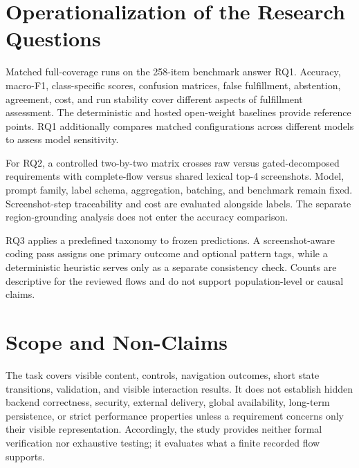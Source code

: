 \section{Operationalization of the Research Questions}\label{operationalization-of-the-research-questions}

Matched full-coverage runs on the 258-item benchmark answer RQ1. Accuracy,
macro-F1, class-specific scores, confusion matrices, false fulfillment,
abstention, agreement, cost, and run stability cover different aspects of
fulfillment assessment. The deterministic and hosted open-weight baselines
provide reference points. RQ1 additionally compares matched configurations
across different models to assess model sensitivity.

For RQ2, a controlled two-by-two matrix crosses raw versus gated-decomposed
requirements with complete-flow versus shared lexical top-4 screenshots. Model, prompt
family, label schema, aggregation, batching, and benchmark remain fixed.
Screenshot-step traceability and cost are evaluated alongside labels. The
separate region-grounding analysis does not enter the accuracy comparison.

RQ3 applies a predefined taxonomy to frozen predictions. A screenshot-aware
coding pass assigns one primary outcome and optional pattern tags, while a
deterministic heuristic serves only as a separate consistency check. Counts are
descriptive for the reviewed flows and do not support population-level or
causal claims.

\section{Scope and Non-Claims}\label{scope-and-non-claims}

The task covers visible content, controls, navigation outcomes, short state
transitions, validation, and visible interaction results. It does not establish
hidden backend correctness, security, external delivery, global availability,
long-term persistence, or strict performance properties unless a requirement
concerns only their visible representation. Accordingly, the study provides
neither formal verification nor exhaustive testing; it evaluates what a finite
recorded flow supports.
